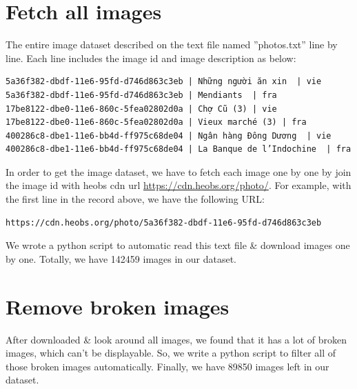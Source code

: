 \documentclass[hidelinks,12pt,a4paper]{report}
\begin{document}
\section{Fetch all images}
The entire image dataset described on the text file named ”photos.txt” line by line. Each line includes the image id and image description as below:
\begin{verbatim}
5a36f382-dbdf-11e6-95fd-d746d863c3eb | Những người ăn xin  | vie
5a36f382-dbdf-11e6-95fd-d746d863c3eb | Mendiants  | fra
17be8122-dbe0-11e6-860c-5fea02802d0a | Chợ Cũ (3) | vie
17be8122-dbe0-11e6-860c-5fea02802d0a | Vieux marché (3) | fra
400286c8-dbe1-11e6-bb4d-ff975c68de04 | Ngân hàng Đông Dương  | vie
400286c8-dbe1-11e6-bb4d-ff975c68de04 | La Banque de l’Indochine  | fra
\end{verbatim}
In order to get the image dataset, we have to fetch each image one by one by join the image id with heobs cdn url \href{https://cdn.heobs.org/photo/}{https://cdn.heobs.org/photo/}. For example, with the first line in the record above, we have the following URL: 
\begin{verbatim}
https://cdn.heobs.org/photo/5a36f382-dbdf-11e6-95fd-d746d863c3eb
\end{verbatim}
We wrote a python script to automatic read this text file \& download images one by one.
Totally, we have 142459 images in our dataset.

\section{Remove broken images}
After downloaded \& look around all images, we found that it has a lot of broken images, which can't be displayable. So, we write a python script to filter all of those broken images automatically. \newline
Finally, we have 89850 images left in our dataset.
\end{document}
